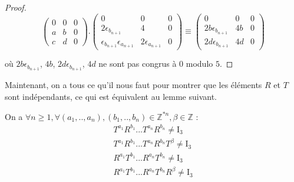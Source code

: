 \begin{proof}
$$  \begin{pmatrix}
    0 & 0 & 0 \\
     a & b & 0 \\
  c  & d & 0
  \end{pmatrix}
  .
  \begin{pmatrix}
     0 & 0 & 0 \\
   2\epsilon_{b_{n+1}} & 4 & 0 \\
  \epsilon_{b_{n+1}}\epsilon_{a_{n+1}}  & 2\epsilon_{a_{n+1}} & 0
  \end{pmatrix}
  \equiv
  \begin{pmatrix}
    0 & 0 & 0 \\
     2b\epsilon_{b_{n+1}} & 4b & 0 \\
  2d\epsilon_{b_{n+1}}  & 4d & 0
  \end{pmatrix}
  $$\par
  où $2b\epsilon_{b_{n+1}}$, $4b$, $2d\epsilon_{b_{n+1}}$, $4d$ ne sont pas congrus à $0$ modulo $5$.
\end{proof}
\noindent
Maintenant, on a tous ce qu'il nous faut pour montrer que les éléments $R$ et $T$ sont indépendants, ce qui est équivalent au lemme suivant.
\begin{lemma}\label{lemme8}
  On a $\forall n \ge 1,\forall (a_1,..,a_n), (b_1,..,b_n) \in \mathbb{Z}^{*n}, \beta \in \mathbb{Z}$ :
  \begin{align*}
    T^{a_1}R^{b_1}...T^{a_n}R^{b_n}  \ne \mathrm{I}_3\\
    T^{a_1}R^{b_1}...T^{a_n}R^{b_n}T^\beta \ne \mathrm{I}_3\\
    R^{a_1}T^{b_1}...R^{a_n}T^{b_n}  \ne \mathrm{I}_3\\
    R^{a_1}T^{b_1}...R^{a_n}T^{b_n}R^\beta \ne \mathrm{I}_3
  \end{align*}
\end{lemma}
